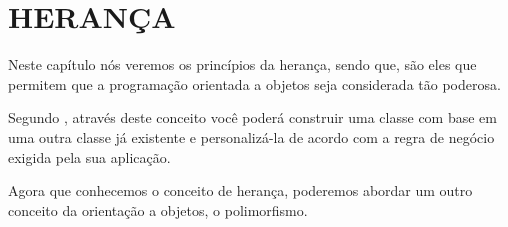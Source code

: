 \section{HERANÇA}
\label{heranca}

Neste capítulo nós veremos os princípios da herança, sendo que, são eles que
permitem que a programação orientada a objetos seja considerada tão poderosa.

Segundo , através deste conceito você poderá
construir uma classe com base em uma outra classe já existente e personalizá-la 
de acordo com a regra de negócio exigida pela sua aplicação.

Agora que conhecemos o conceito de herança, poderemos abordar um outro conceito
da orientação a objetos, o polimorfismo.
